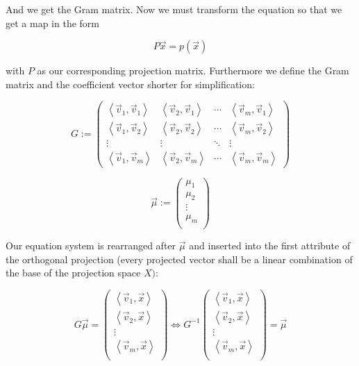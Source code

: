 \documentclass{article}
\newcommand{\lrangle}[1]{\left\langle #1 \right\rangle}
\begin{document}
And we get the Gram matrix.
Now we must transform the equation so that we get a map in the form

    \begin{equation}
        P\vec{x}=p(\vec{x})
    \end{equation}

with \(P\) as our corresponding projection matrix.
Furthermore we define the Gram matrix and the coefficient vector shorter for
simplification:

    \begin{equation}
        G :=
        \begin{pmatrix}
            \lrangle{ \vec{v}_1, \vec{v}_1 } &
            \lrangle{ \vec{v}_2, \vec{v}_1 } &
            \cdots &
            \lrangle{ \vec{v}_m, \vec{v}_1 } \\
            \lrangle{ \vec{v}_1, \vec{v}_2 } &
            \lrangle{ \vec{v}_2, \vec{v}_2 } &
            \cdots &
            \lrangle{ \vec{v}_m, \vec{v}_2 } \\
            \vdots & \vdots & \ddots & \vdots \\
            \lrangle{ \vec{v}_1, \vec{v}_m } &
            \lrangle{ \vec{v}_2, \vec{v}_m } &
            \cdots &
            \lrangle{ \vec{v}_m, \vec{v}_m }
        \end{pmatrix}
    \end{equation}

    \begin{equation}
        \vec{\mu} :=
        \begin{pmatrix}
            \mu _1 \\
            \mu _2 \\
            \vdots \\
            \mu _m \\
        \end{pmatrix}
    \end{equation}

Our equation system is rearranged after \( \vec{\mu} \) and inserted into the
first attribute of the orthogonal projection (every projected vector shall be a
linear combination of the base of the projection space \(X)\):

    \begin{equation}
        G \vec{\mu} =
        \begin{pmatrix}
            \lrangle{ \vec{v}_1, \vec{x} } \\
            \lrangle{ \vec{v}_2, \vec{x} } \\
            \vdots \\
            \lrangle{ \vec{v}_m, \vec{x} } \\
        \end{pmatrix}
        \iff G^{-1}
        \begin{pmatrix}
            \lrangle{ \vec{v}_1, \vec{x} } \\
            \lrangle{ \vec{v}_2, \vec{x} } \\
            \vdots \\
            \lrangle{ \vec{v}_m, \vec{x} } \\
        \end{pmatrix} = \vec{\mu}
    \end{equation}
\end{document}
